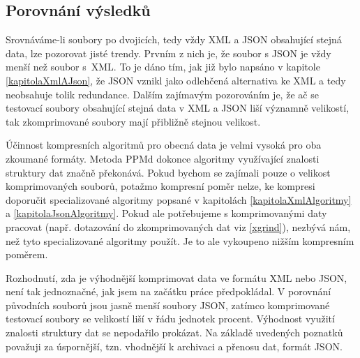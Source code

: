 \subsection{Porovnání výsledků}
Srovnáváme-li soubory po dvojicích, tedy vždy XML a JSON obsahující stejná data, lze pozorovat jisté trendy. Prvním z nich je, že soubor s JSON je vždy menší než soubor s~XML. To je dáno tím, jak již bylo napsáno v kapitole \ref{kapitolaXmlAJson}, že JSON vznikl jako odlehčená alternativa ke XML a tedy neobsahuje tolik redundance. Dalším zajímavým pozorováním je, že ač se testovací soubory obsahující stejná data v XML a JSON liší významně velikostí, tak zkomprimované soubory mají přibližně stejnou velikost.

Účinnost kompresních algoritmů pro obecná data je velmi vysoká pro oba zkoumané formáty. Metoda PPMd dokonce algoritmy využívající znalosti struktury dat značně pře\-ko\-ná\-vá. Pokud bychom se zajímali pouze o velikost komprimovaných souborů, potažmo kompresní poměr nelze, ke kompresi doporučit specializované algoritmy popsané v kapitolách \ref{kapitolaXmlAlgoritmy} a \ref{kapitolaJsonAlgoritmy}. Pokud ale potřebujeme s komprimovanými daty pracovat (např. dotazování do zkomprimovaných dat viz \ref{xgrind}), nezbývá nám, než tyto specializované algoritmy použít. Je to ale vykoupeno nižším kompresním poměrem.

Rozhodnutí, zda je výhodnější komprimovat data ve formátu XML nebo JSON, není tak jednoznačné, jak jsem na začátku práce předpokládal. V porovnání původních souborů jsou jasně menší soubory JSON, zatímco komprimované testovací soubory se velikostí liší v řádu jednotek procent. Výhodnost využití znalosti struktury dat se nepodařilo prokázat. Na základě uvedených poznatků považuji za úspornější, tzn. vhodnější k archivaci a přenosu dat, formát JSON.